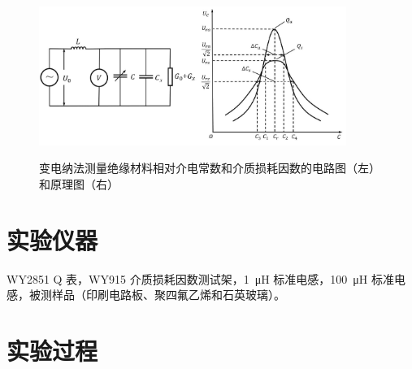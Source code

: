 \documentclass[a4paper,utf8]{article}
\begin{document}
            \begin{figure}[!ht]\centering
                \includegraphics[width=100mm]{fg5.jpg}\
                \caption{变电纳法测量绝缘材料相对介电常数和介质损耗因数的电路图（左）和原理图（右）\label{fig:5}}
            \end{figure}

\section{实验仪器}%
    WY2851 Q 表，WY915 介质损耗因数测试架，\SI{1}{\micro\henry} 标准电感，\SI{100}{\micro\henry} 标准电感，被测样品（印刷电路板、聚四氟乙烯和石英玻璃）。

\section{实验过程}%
\end{document}
